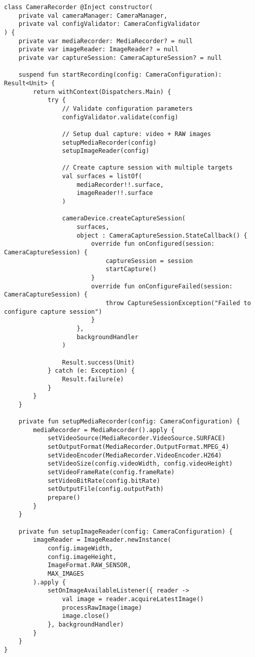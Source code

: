 \documentclass[12pt,a4paper]{article}
\begin{document}
\begin{verbatim}
class CameraRecorder @Inject constructor(
    private val cameraManager: CameraManager,
    private val configValidator: CameraConfigValidator
) {
    private var mediaRecorder: MediaRecorder? = null
    private var imageReader: ImageReader? = null
    private var captureSession: CameraCaptureSession? = null
    
    suspend fun startRecording(config: CameraConfiguration): Result<Unit> {
        return withContext(Dispatchers.Main) {
            try {
                // Validate configuration parameters
                configValidator.validate(config)
                
                // Setup dual capture: video + RAW images
                setupMediaRecorder(config)
                setupImageReader(config)
                
                // Create capture session with multiple targets
                val surfaces = listOf(
                    mediaRecorder!!.surface,
                    imageReader!!.surface
                )
                
                cameraDevice.createCaptureSession(
                    surfaces,
                    object : CameraCaptureSession.StateCallback() {
                        override fun onConfigured(session: CameraCaptureSession) {
                            captureSession = session
                            startCapture()
                        }
                        override fun onConfigureFailed(session: CameraCaptureSession) {
                            throw CaptureSessionException("Failed to configure capture session")
                        }
                    },
                    backgroundHandler
                )
                
                Result.success(Unit)
            } catch (e: Exception) {
                Result.failure(e)
            }
        }
    }
    
    private fun setupMediaRecorder(config: CameraConfiguration) {
        mediaRecorder = MediaRecorder().apply {
            setVideoSource(MediaRecorder.VideoSource.SURFACE)
            setOutputFormat(MediaRecorder.OutputFormat.MPEG_4)
            setVideoEncoder(MediaRecorder.VideoEncoder.H264)
            setVideoSize(config.videoWidth, config.videoHeight)
            setVideoFrameRate(config.frameRate)
            setVideoBitRate(config.bitRate)
            setOutputFile(config.outputPath)
            prepare()
        }
    }
    
    private fun setupImageReader(config: CameraConfiguration) {
        imageReader = ImageReader.newInstance(
            config.imageWidth,
            config.imageHeight,
            ImageFormat.RAW_SENSOR,
            MAX_IMAGES
        ).apply {
            setOnImageAvailableListener({ reader ->
                val image = reader.acquireLatestImage()
                processRawImage(image)
                image.close()
            }, backgroundHandler)
        }
    }
}
\end{verbatim}
\end{document}
